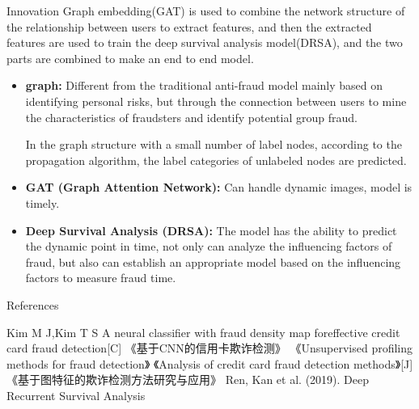 \documentclass[compress,xcolor=table,hyperref]{beamer}
\begin{document}
\begin{frame}{Innovation}\footnotesize\justifying
	Graph embedding(GAT) is used to combine the network structure of the relationship between users to extract features, and then the extracted features are used to train the deep survival analysis model(DRSA), and the two parts are combined to make an end to end model.
		\begin{itemize}
			\item
		\justifying	\textbf{graph:} Different from the traditional anti-fraud model mainly based on identifying personal risks, but through the connection between users to mine the characteristics of fraudsters and identify potential group fraud.
			
	\justifying	In the graph structure with a small number of label nodes, according to the propagation algorithm, the label categories of unlabeled nodes are predicted.\pause
			\item	\justifying\textbf{GAT (Graph Attention Network):}  Can handle dynamic images, model is timely.\pause
			
			
		\item	\justifying\textbf{Deep Survival Analysis (DRSA):} The model has the ability to predict the dynamic point in time, not only can analyze the influencing factors of fraud, but also can establish an appropriate model based on the influencing factors to measure fraud time.
			
		
			
		\end{itemize}
		
	
\end{frame}



\begin{frame}{References}
	
\begin{thebibliography}{99}
Kim M J,Kim T S A neural classifier with fraud density map foreffective credit card fraud detection[C]
《基于CNN的信用卡欺诈检测》
《Unsupervised profiling methods for fraud detection》
《Analysis of credit card fraud detection methods》[J]
 《基于图特征的欺诈检测方法研究与应用》
 Ren, Kan et al. (2019). Deep Recurrent Survival Analysis
\end{thebibliography}
	
\end{frame}
\end{document}
